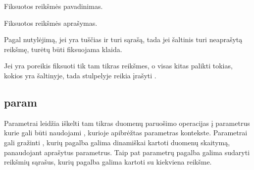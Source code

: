 \documentclass[letterpaper,10pt,lithuanian]{sphinxmanual}
\begin{document}

\begin{fulllineitems}
\label{\detokenize{dimensijos:enum.title}}
\pysigstartsignatures
\pysigline
{}
\pysigstopsignatures
\sphinxAtStartPar
Fiksuotos reikšmės pavadinimas.

\end{fulllineitems}


\begin{fulllineitems}
\label{\detokenize{dimensijos:enum.description}}
\pysigstartsignatures
\pysigline
{}
\pysigstopsignatures
\sphinxAtStartPar
Fiksuotos reikšmės aprašymas.

\end{fulllineitems}


\sphinxAtStartPar
Pagal nutylėjimą, jei {\hyperref[\detokenize{dimensijos:property.prepare}]{}} yra tuščias ir {\hyperref[\detokenize{formatas:property}]{}}
turi {\hyperref[\detokenize{dimensijos:enum}]{}} sąrašą, tada jei šaltinis turi neaprašytą reikšmę, turėtų
būti fiksuojama klaida.

\sphinxAtStartPar
Jei yra poreikis fiksuoti tik tam tikras reikšmes, o visas kitas palikti tokias,
kokios yra šaltinyje, tada {\hyperref[\detokenize{dimensijos:property.prepare}]{}} stulpelyje reikia įrašyti
.


\subsection{param}
\label{\detokenize{dimensijos:param}}\label{\detokenize{dimensijos:id11}}\label{\detokenize{dimensijos:module-param}}
\sphinxAtStartPar
Parametrai leidžia iškelti tam tikras duomenų paruošimo operacijas į parametrus
kurie gali būti naudojami {\hyperref[\detokenize{dimensijos:dimensijos}]{}}, kurioje apibrėžtas parametras
kontekste. Parametrai gali gražinti {\hyperref[\detokenize{savokos:term-iteratorius}]{}}, kurių pagalba galima
dinamiškai kartoti {\hyperref[\detokenize{formatas:resource}]{}} duomenų skaitymą, panaudojant aprašytus
parametrus. Taip pat parametrų pagalba galima sudaryti reikšmių sąrašus, kurių
pagalba galima kartoti {\hyperref[\detokenize{formatas:resource}]{}} su kiekviena reikšme.
\end{document}
